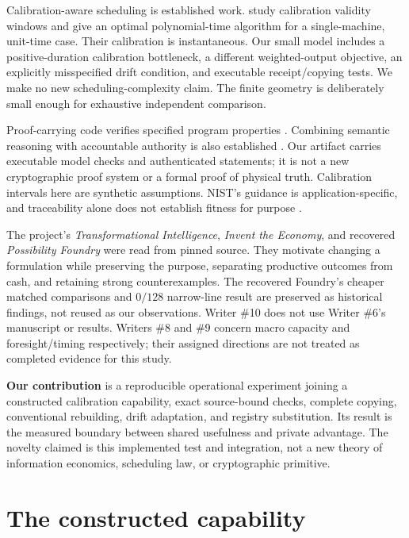 \documentclass[11pt]{article}
\begin{document}
Calibration-aware scheduling is established work. \citet{bender2013} study calibration validity windows and give an optimal polynomial-time algorithm for a single-machine, unit-time case. Their calibration is instantaneous. Our small model includes a positive-duration calibration bottleneck, a different weighted-output objective, an explicitly misspecified drift condition, and executable receipt/copying tests. We make no new scheduling-complexity claim. The finite geometry is deliberately small enough for exhaustive independent comparison.

Proof-carrying code verifies specified program properties \citep{neculalee1996,necula1997}. Combining semantic reasoning with accountable authority is also established \citep{whitehead2004}. Our artifact carries executable model checks and authenticated statements; it is not a new cryptographic proof system or a formal proof of physical truth. Calibration intervals here are synthetic assumptions. NIST's guidance is application-specific, and traceability alone does not establish fitness for purpose \citep{nistinterval2026,nisttraceability2021}.

The project's \emph{Transformational Intelligence}, \emph{Invent the Economy}, and recovered \emph{Possibility Foundry} were read from pinned source. They motivate changing a formulation while preserving the purpose, separating productive outcomes from cash, and retaining strong counterexamples. The recovered Foundry's cheaper matched comparisons and $0/128$ narrow-line result are preserved as historical findings, not reused as our observations. Writer \#10 does not use Writer \#6's manuscript or results. Writers \#8 and \#9 concern macro capacity and foresight/timing respectively; their assigned directions are not treated as completed evidence for this study.

\textbf{Our contribution} is a reproducible operational experiment joining a constructed calibration capability, exact source-bound checks, complete copying, conventional rebuilding, drift adaptation, and registry substitution. Its result is the measured boundary between shared usefulness and private advantage. The novelty claimed is this implemented test and integration, not a new theory of information economics, scheduling law, or cryptographic primitive.

\section{The constructed capability}
\end{document}
